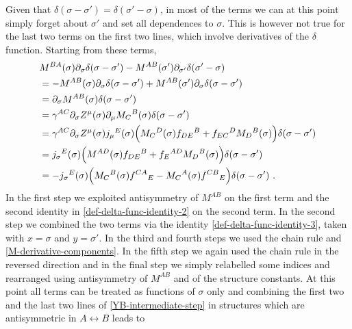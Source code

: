 \documentclass[12pt]{article}
\numberwithin{equation}{section}
\begin{document}
Given that $\delta(\sigma-\sigma')=\delta(\sigma'-\sigma)$, in most of the terms we can at this point simply forget about $\sigma'$ and set all dependences to $\sigma$. This is however not true for the last two terms on the first two lines, which involve derivatives of the $\delta$ function. Starting from these terms,
\begin{equation}
\begin{aligned}
&M^{BA}(\sigma)\partial_{\sigma}\delta(\sigma-\sigma')-M^{AB}(\sigma')\partial_{\sigma'}\delta(\sigma'-\sigma)
\\
&=-M^{AB}(\sigma)\partial_{\sigma}\delta(\sigma-\sigma')+M^{AB}(\sigma')\partial_{\sigma}\delta(\sigma-\sigma')
\\
&=\partial_{\sigma}M^{AB}(\sigma)\delta(\sigma-\sigma')
\\
&=\gamma^{AC}\partial_{\sigma}Z^{\mu}(\sigma)\partial_{\mu}M_{C}{}^{B}(\sigma)\delta(\sigma-\sigma')
\\
&=\gamma^{AC}\partial_{\sigma}Z^{\mu}(\sigma)j_{\mu}{}^{E}(\sigma)\Bigl( M_{C}{}^{D}(\sigma)f_{DE}{}^{B}+f_{EC}{}^{D}M_{D}{}^{B}(\sigma) \Bigr)\delta(\sigma-\sigma')
\\
&=j_{\sigma}{}^{E}(\sigma)\Bigl( M^{AD}(\sigma)f_{DE}{}^{B}+f_{E}{}^{AD}M_{D}{}^{B}(\sigma) \Bigr) \delta(\sigma-\sigma')
\\
&= -j_{\sigma}{}^{E}(\sigma)\Bigl( M_{C}{}^{B}(\sigma)f^{CA}{}_{E}-M_{C}{}^{A}(\sigma)f^{CB}{}_{E} \Bigr) \delta(\sigma-\sigma')\,\,  .
\end{aligned}
\end{equation}
In the first step we exploited antisymmetry of $M^{AB}$ on the first term and the second identity in \eqref{def-delta-func-identity-2} on the second term. In the second step we combined the two terms via the identity \eqref{def-delta-func-identity-3}, taken with $x=\sigma$ and $y=\sigma'$. In the third and fourth steps we used the chain rule and \eqref{M-derivative-components}. In the fifth step we again used  the chain rule in the reversed direction and in the final step we simply relabelled some indices and rearranged using antisymmetry of $M^{AB}$ and of the structure constants. At this point all terms can be treated as functions of $\sigma$ only and combining the first two and the last two lines of \eqref{YB-intermediate-step} in structures which are antisymmetric in $A\leftrightarrow B$ leads to
\end{document}
